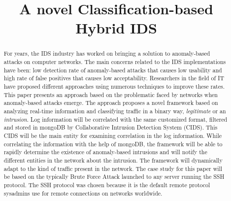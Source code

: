 \documentclass[conference]{IEEEtran}
\begin{document}
%
\title{A novel Classification-based Hybrid IDS}


\author{
\and
{}
}

\maketitle


\begin{abstract}
For years, the IDS industry has worked on bringing a solution to anomaly-based attacks on computer networks. The main concerns related to the IDS implementations have been: low detection rate of anomaly-based attacks that causes low usability and high rate of false positives that causes low acceptability. Researchers in the field of IT have proposed different approaches using numerous techniques to improve these rates.  This paper presents an approach based on the problematic faced by networks when anomaly-based attacks emerge.  The approach proposes a novel framework based on analyzing real-time information and classifying traffic in a binary way, \emph{legitimate}  or an \emph{intrusion}. Log information will be correlated with the same customized format, filtered and stored in mongoDB by Collaborative Intrusion  Detection System (CIDS). This CIDS will be the main entity for examining correlation in the log information.  While correlating the information with the help of mongoDB, the framework will be able to rapidly determine the existence of anomaly-based intrusions and will notify the different entities in the network about the intrusion. The framework will dynamically adapt to the kind of traffic present in the network. The case study for this paper will be based on the typically Brute Force Attack launched to any server running the SSH protocol. The SSH protocol was chosen because it is the default remote protocol sysadmins use for remote connections on networks worldwide.
\end{abstract}
\end{document}
